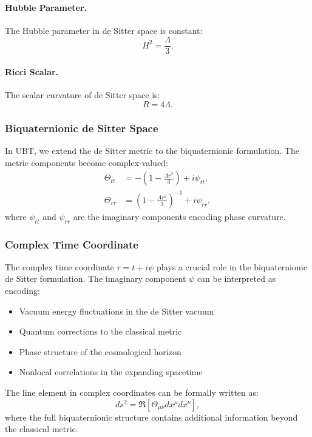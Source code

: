 \paragraph{Hubble Parameter.}
The Hubble parameter in de Sitter space is constant:
\begin{equation}
H^2 = \frac{\Lambda}{3}.
\end{equation}

\paragraph{Ricci Scalar.}
The scalar curvature of de Sitter space is:
\begin{equation}
R = 4\Lambda.
\label{eq:desitter_ricci}
\end{equation}

\subsubsection{Biquaternionic de Sitter Space}

In UBT, we extend the de Sitter metric to the biquaternionic formulation. The metric components become complex-valued:
\begin{align}
\Theta_{tt} &= -\left(1 - \frac{\Lambda r^2}{3}\right) + i\psi_{tt}, \\
\Theta_{rr} &= \left(1 - \frac{\Lambda r^2}{3}\right)^{-1} + i\psi_{rr},
\end{align}
where $\psi_{tt}$ and $\psi_{rr}$ are the imaginary components encoding phase curvature.

\subsubsection{Complex Time Coordinate}

The complex time coordinate $\tau = t + i\psi$ plays a crucial role in the biquaternionic de Sitter formulation. The imaginary component $\psi$ can be interpreted as encoding:
\begin{itemize}
\item Vacuum energy fluctuations in the de Sitter vacuum
\item Quantum corrections to the classical metric
\item Phase structure of the cosmological horizon
\item Nonlocal correlations in the expanding spacetime
\end{itemize}

The line element in complex coordinates can be formally written as:
\begin{equation}
ds^2 = \Re\left[\Theta_{\mu\nu}dx^\mu dx^\nu\right],
\end{equation}
where the full biquaternionic structure contains additional information beyond the classical metric.

